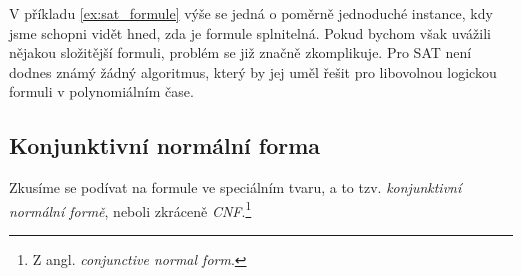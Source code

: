 V příkladu \ref{ex:sat_formule} výše se jedná o poměrně jednoduché instance, kdy jsme schopni vidět hned, zda je formule splnitelná. Pokud bychom však uvážili nějakou složitější formuli, problém se již značně zkomplikuje.
Pro SAT není dodnes známý žádný algoritmus, který by jej uměl řešit pro libovolnou logickou formuli v polynomiálním čase.

\subsection{Konjunktivní normální forma}\label{subsec:cnf}

Zkusíme se podívat na formule ve speciálním tvaru, a to tzv. \emph{konjunktivní normální formě}, neboli zkráceně \emph{CNF}.\footnote{Z angl. \emph{conjunctive normal form}.}

